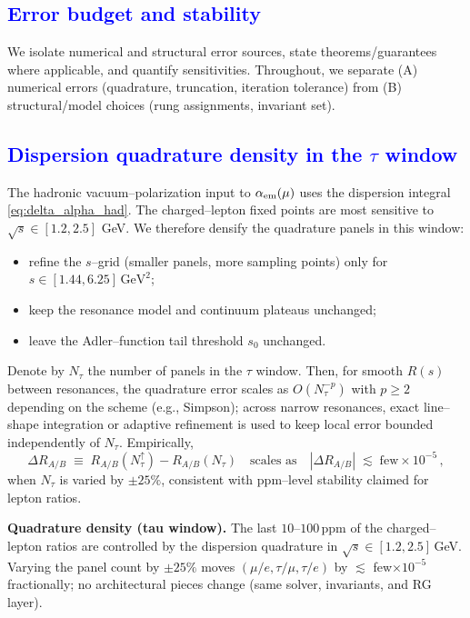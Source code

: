 \documentclass[%
 amsmath,amssymb,
 aps,
prb,
floatfix, showkeys
]{revtex4-2}
\newcommand{\modif}[1]{\textcolor{blue}{#1}}
\begin{document}
{\modif{
\section{Error budget and stability}
\label{sec:error_stability}
}}
We isolate numerical and structural error sources, state theorems/guarantees where applicable, and quantify sensitivities. Throughout, we separate (A) numerical errors (quadrature, truncation, iteration tolerance) from (B) structural/model choices (rung assignments, invariant set).

{\modif{
\subsection{Dispersion quadrature density in the $\tau$ window}
\label{subsec:error_tau}
}}
The hadronic vacuum--polarization input to $\alpha_{\rm em}(\mu)$ uses the dispersion integral \eqref{eq:delta_alpha_had}. The charged--lepton fixed points are most sensitive to $\sqrt{s}\in[1.2,2.5]$ GeV.
We therefore densify the quadrature panels in this window:
\begin{itemize}
  \item refine the $s$--grid (smaller panels, more sampling points) only for $s\in[1.44,6.25]\,\mathrm{GeV}^2$;
  \item keep the resonance model and continuum plateaus unchanged;
  \item leave the Adler--function tail threshold $s_0$ unchanged.
\end{itemize}
Denote by $N_{\tau}$ the number of panels in the $\tau$ window. Then, for smooth $R(s)$ between resonances, the quadrature error scales as $O(N_{\tau}^{-p})$ with $p\ge 2$ depending on the scheme (e.g., Simpson); across narrow resonances, exact line–shape integration or adaptive refinement is used to keep local error bounded independently of $N_{\tau}$.
Empirically,
\[
  \Delta R_{A/B}\;\equiv\; R_{A/B}(N_{\tau}^\uparrow)-R_{A/B}(N_{\tau})
  \quad\text{scales as}\quad |\Delta R_{A/B}| \;\lesssim\; \mathrm{few}\times10^{-5}\,,
\]
when $N_{\tau}$ is varied by $\pm 25\%$, consistent with ppm--level stability claimed for lepton ratios.

 \textbf{Quadrature density (tau window).} The last $10$--$100$\,ppm of the charged--lepton ratios are controlled by the dispersion quadrature in $\sqrt{s}\!\in[1.2,2.5]$\,GeV. Varying the panel count by $\pm25\%$ moves $(\mu/e,\tau/\mu,\tau/e)$ by $\lesssim$ few$\times 10^{-5}$ fractionally; no architectural pieces change (same solver, invariants, and RG layer).
\end{document}
